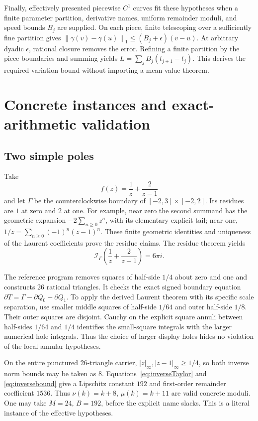 \documentclass[11pt]{article}
\theoremstyle{definition}
\newcommand{\norm}[1]{\left\lVert#1\right\rVert_1}
\newcommand{\Int}{\mathcal I}
\newcommand{\bd}{\partial}
\begin{document}
Finally, effectively presented piecewise \(C^1\) curves fit these
hypotheses when a finite parameter partition, derivative names, uniform
remainder moduli, and speed bounds \(B_j\) are supplied. On each piece,
finite telescoping over a sufficiently fine partition gives
\(\norm{\gamma(v)-\gamma(u)}\le(B_j+\epsilon)(v-u)\).
At arbitrary dyadic \(\epsilon\), rational closure removes the error.
Refining a finite partition by the piece boundaries and summing yields
\(L=\sum_jB_j(t_{j+1}-t_j)\). This derives the required variation bound
without importing a mean value theorem.

\section{Concrete instances and exact-arithmetic validation}\label{sec:examples}

\subsection{Two simple poles}

Take
\[
 f(z)=\frac1z+\frac2{z-1}
\]
and let \(\Gamma\) be the counterclockwise boundary of
\([-2,3]\times[-2,2]\). Its residues are \(1\) at zero and \(2\) at one.
For example, near zero the second summand has the geometric expansion
\(-2\sum_{n\ge0}z^n\), with its elementary explicit tail; near one,
\(1/z=\sum_{n\ge0}(-1)^n(z-1)^n\). These finite geometric identities
and uniqueness of the Laurent coefficients prove the residue claims.
The residue theorem yields
\begin{equation}\label{eq:example}
 \Int_\Gamma\left(\frac1z+\frac2{z-1}\right)=6\pi i.
\end{equation}

The reference program removes squares of half-side \(1/4\) about zero
and one and constructs 26 rational triangles. It checks the exact
signed boundary equation \(\bd T=\Gamma-\bd Q_0-\bd Q_1\).
To apply the derived Laurent theorem with its specific scale separation,
use smaller middle squares of half-side \(1/64\) and outer half-side
\(1/8\). Their outer squares are disjoint. Cauchy on the explicit square
annuli between half-sides \(1/64\) and \(1/4\) identifies the small-square
integrals with the larger numerical hole integrals. Thus the choice of
larger display holes hides no violation of the local annular hypotheses.

On the entire punctured 26-triangle carrier,
\(|z|_\infty,|z-1|_\infty\ge1/4\), so both inverse norm bounds may be
taken as \(8\). Equations~\eqref{eq:inverseTaylor} and
\eqref{eq:inversebound} give a Lipschitz constant \(192\) and
first-order remainder coefficient \(1536\). Thus
\(\nu(k)=k+8\), \(\mu(k)=k+11\) are valid concrete moduli.
One may take \(M=24\), \(B=192\), before the explicit name slacks.
This is a literal instance of the effective hypotheses.
\end{document}

